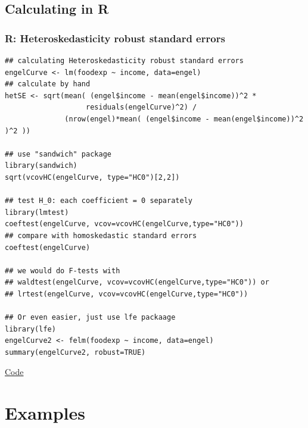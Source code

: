 
\subsection{Calculating in R}

\begin{frame}[fragile] \frametitle{R: Heteroskedasticity robust standard
    errors}
  {\tiny{
  \begin{lstlisting}
## calculating Heteroskedasticity robust standard errors
engelCurve <- lm(foodexp ~ income, data=engel)
## calculate by hand
hetSE <- sqrt(mean( (engel$income - mean(engel$income))^2 *
                   residuals(engelCurve)^2) /
              (nrow(engel)*mean( (engel$income - mean(engel$income))^2 )^2 )) 

## use "sandwich" package
library(sandwich)
sqrt(vcovHC(engelCurve, type="HC0")[2,2])

## test H_0: each coefficient = 0 separately
library(lmtest)
coeftest(engelCurve, vcov=vcovHC(engelCurve,type="HC0"))
## compare with homoskedastic standard errors
coeftest(engelCurve)

## we would do F-tests with
## waldtest(engelCurve, vcov=vcovHC(engelCurve,type="HC0")) or
## lrtest(engelCurve, vcov=vcovHC(engelCurve,type="HC0"))

## Or even easier, just use lfe packaage
library(lfe)
engelCurve2 <- felm(foodexp ~ income, data=engel)
summary(engelCurve2, robust=TRUE)
  \end{lstlisting}
    }}
  \href{https://bitbucket.org/paulschrimpf/econ326/src/master/notes/06/engel.R?at=master} 
  {Code} 
\end{frame}

\section{Examples}

